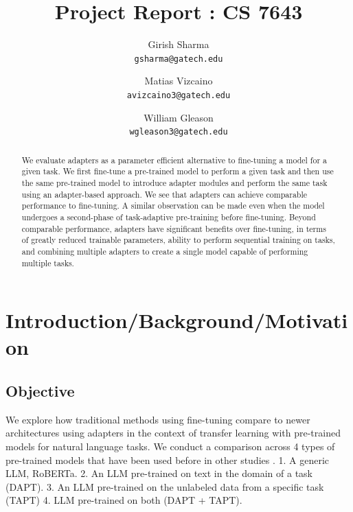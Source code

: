 \documentclass[draft,10pt,twocolumn,letterpaper]{article}
\begin{document}
\title{Project Report : CS 7643}

\author{Girish Sharma\\
{\tt\small gsharma@gatech.edu}
\and
Matias Vizcaino \\
{\tt\small avizcaino3@gatech.edu}
\and
William Gleason\\
{\tt\small wgleason3@gatech.edu}
}

\maketitle

\begin{abstract}
   We evaluate adapters as a parameter efficient alternative to fine-tuning a model for a given task. We first fine-tune a pre-trained model to perform a given task and then use the same pre-trained model to introduce adapter modules and perform the same task using an adapter-based approach. We see that adapters can achieve comparable performance to fine-tuning. A similar observation can be made even when the model undergoes a second-phase of task-adaptive pre-training before fine-tuning. Beyond comparable performance, adapters have significant benefits over fine-tuning, in terms of greatly reduced trainable parameters, ability to perform sequential training on tasks, and combining multiple adapters to create a single model capable of performing multiple tasks.
\end{abstract}

\section{Introduction/Background/Motivation}

\subsection{Objective} We explore how traditional methods using fine-tuning compare to newer architectures using adapters in the context of transfer learning with pre-trained models for natural language tasks. We conduct a comparison across 4 types of pre-trained models that have been used before in other studies \cite{gururangan2020dont}. 1. A generic LLM, RoBERTa. 2. An LLM pre-trained on text in the domain of a task (DAPT). 3. An LLM pre-trained on the unlabeled data from a specific task (TAPT) 4. LLM pre-trained on both (DAPT + TAPT). 
\end{document}
